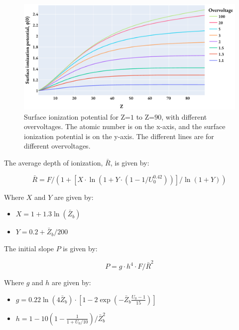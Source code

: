 \begin{figure}[htbp]
    \centering
    \includegraphics[width=0.8\linewidth]{figures/PAP_surface_ionization_potential.pdf}
    \caption{
        Surface ionization potential for Z=$1$ to Z=$90$, with different overvoltages.
        The atomic number is on the x-axis, and the surface ionization potential is on the y-axis.
        The different lines are for different overvoltages.
    }
    \label{fig:pap:phi_0}
\end{figure}

The average depth of ionization, $\bar{R}$, is given by:

\begin{equation}
    \label{eq:theory:quantitative:pap:R_bar}
    \bar{R} = F / (1 + [X \cdot \ln(1 + Y \cdot (1 - 1/U_0^{0.42}))]/\ln(1 + Y))
\end{equation}

Where $X$ and $Y$ are given by:

\begin{itemize}
    \item $ X = 1 + 1.3 \ln(\bar{Z}_b) $
    \item $ Y = 0.2 + \bar{Z}_b/200 $
\end{itemize}




The initial slope $P$ is given by:

\begin{equation}
    \label{eq:theory:quantitative:pap:slope_P}
    P = g \cdot h^4 \cdot F/\bar{R}^2
\end{equation}

Where $g$ and $h$ are given by:

\begin{itemize}
    \item $ g = 0.22 \ln(4 \bar{Z}_b) \cdot [1 - 2 \exp(-\bar{Z}_b \frac{U_0 - 1}{15})] $
    \item $ h = 1 - 10(1-\frac{1}{1+ U_0/10})/\bar{Z}_b^2 $
\end{itemize}


